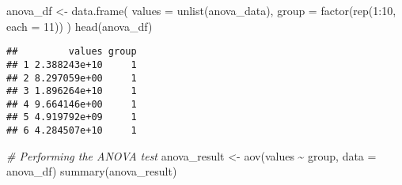 \documentclass[
]{article}
\newenvironment{Shaded}{\begin{snugshade}}{\end{snugshade}}
\newcommand{\AttributeTok}[1]{\textcolor[rgb]{0.77,0.63,0.00}{#1}}
\newcommand{\CommentTok}[1]{\textcolor[rgb]{0.56,0.35,0.01}{\textit{#1}}}
\newcommand{\ControlFlowTok}[1]{\textcolor[rgb]{0.13,0.29,0.53}{\textbf{#1}}}
\newcommand{\DecValTok}[1]{\textcolor[rgb]{0.00,0.00,0.81}{#1}}
\newcommand{\FunctionTok}[1]{\textcolor[rgb]{0.00,0.00,0.00}{#1}}
\newcommand{\NormalTok}[1]{#1}
\newcommand{\OtherTok}[1]{\textcolor[rgb]{0.56,0.35,0.01}{#1}}
\newcommand{\SpecialCharTok}[1]{\textcolor[rgb]{0.00,0.00,0.00}{#1}}
\begin{document}
\begin{Shaded}
\end{Shaded}

\begin{Shaded}
\begin{Highlighting}[]
\NormalTok{anova\_df }\OtherTok{\textless{}{-}} \FunctionTok{data.frame}\NormalTok{(}
  \AttributeTok{values =} \FunctionTok{unlist}\NormalTok{(anova\_data),}
  \AttributeTok{group =} \FunctionTok{factor}\NormalTok{(}\FunctionTok{rep}\NormalTok{(}\DecValTok{1}\SpecialCharTok{:}\DecValTok{10}\NormalTok{, }\AttributeTok{each =} \DecValTok{11}\NormalTok{))}
\NormalTok{)}
\FunctionTok{head}\NormalTok{(anova\_df)}
\end{Highlighting}
\end{Shaded}

\begin{verbatim}
##         values group
## 1 2.388243e+10     1
## 2 8.297059e+00     1
## 3 1.896264e+10     1
## 4 9.664146e+00     1
## 5 4.919792e+09     1
## 6 4.284507e+10     1
\end{verbatim}

\begin{Shaded}
\begin{Highlighting}[]
\CommentTok{\# Performing the ANOVA test}
\NormalTok{anova\_result }\OtherTok{\textless{}{-}} \FunctionTok{aov}\NormalTok{(values }\SpecialCharTok{\textasciitilde{}}\NormalTok{ group, }\AttributeTok{data =}\NormalTok{ anova\_df)}
\FunctionTok{summary}\NormalTok{(anova\_result)}
\end{Highlighting}
\end{Shaded}
\end{document}
